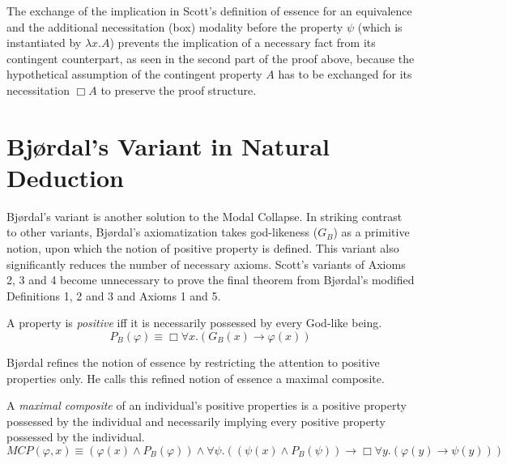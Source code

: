 \documentclass[smallextended]{svjour3}
\newcommand{\imp}{\rightarrow}
\newcommand{\all}{\forall}
\newcommand{\nec}{\Box} %
\begin{document}
The exchange of the implication in Scott's definition of essence for an equivalence and the additional necessitation (box) modality before the property $\psi$ (which is instantiated by $\lambda x. A$) prevents the implication of a necessary fact from its contingent counterpart, as seen in the second part of the proof above, because the hypothetical assumption of the contingent property $A$ has to be exchanged for its necessitation $\nec A$ to preserve the proof structure. 



\section{Bj{\o}rdal's Variant in Natural Deduction}
\label{sec:bjordal}


\setcounter{lemma}{0}
\setcounter{theorem}{0}
\setcounter{corollary}{0}


Bj{\o}rdal's variant \citep{bjordal,fuhrmann} is another solution to the Modal Collapse. In striking contrast to other variants, Bj\o rdal's axiomatization takes god-likeness ($G_B$) as a primitive notion, upon which the notion of positive property is defined. This variant also significantly reduces the number of necessary axioms. Scott's variants of Axioms 2, 3 and 4 become unnecessary to prove the final theorem from Bj{\o}rdal's modified Definitions 1, 2 and 3 and Axioms 1 and 5.


\setcounter{definition}{0}
\begin{definition}[Changed]
\label{B:D1}
A property is \emph{positive} iff it is necessarily possessed by every God-like being.
$$
P_B(\varphi) \equiv \nec \all x. (G_B(x) \imp \varphi(x))
$$
\end{definition}

Bj{\o}rdal refines the notion of essence by restricting the attention to positive properties only. He calls this refined notion of essence a maximal composite.

\newcommand{\MCP}{\mathit{MCP}}

\begin{definition}[Changed]
\label{B:D2}
A \emph{maximal composite} of an individual's positive properties is a positive property possessed by the individual and necessarily implying every positive property possessed by the individual.
$$\MCP(\varphi, x) \equiv (\varphi(x) \wedge P_B (\varphi)) \wedge \all\psi.((\psi(x) \wedge P_B (\psi)) \imp \nec\all y.(\varphi(y) \imp \psi(y)))
$$
\end{definition}
\end{document}
